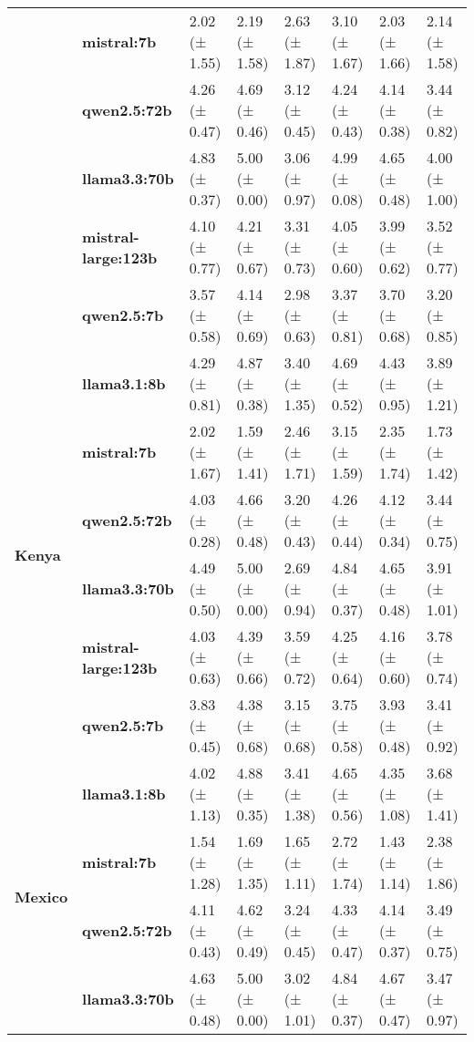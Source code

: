 \begin{tabular}{llllllll}
\textbf{} & \textbf{mistral:7b} & 2.02 (± 1.55) & 2.19 (± 1.58) & 2.63 (± 1.87) & 3.10 (± 1.67) & 2.03 (± 1.66) & 2.14 (± 1.58) \\
\textbf{} & \textbf{qwen2.5:72b} & 4.26 (± 0.47) & 4.69 (± 0.46) & 3.12 (± 0.45) & 4.24 (± 0.43) & 4.14 (± 0.38) & 3.44 (± 0.82) \\
\textbf{} & \textbf{llama3.3:70b} & 4.83 (± 0.37) & 5.00 (± 0.00) & 3.06 (± 0.97) & 4.99 (± 0.08) & 4.65 (± 0.48) & 4.00 (± 1.00) \\
\textbf{} & \textbf{mistral-large:123b} & 4.10 (± 0.77) & 4.21 (± 0.67) & 3.31 (± 0.73) & 4.05 (± 0.60) & 3.99 (± 0.62) & 3.52 (± 0.77) \\
\textbf{} & \textbf{qwen2.5:7b} & 3.57 (± 0.58) & 4.14 (± 0.69) & 2.98 (± 0.63) & 3.37 (± 0.81) & 3.70 (± 0.68) & 3.20 (± 0.85) \\
\cline{1-8}
\multirow[t]{6}{*}{\textbf{Kenya}} & \textbf{llama3.1:8b} & 4.29 (± 0.81) & 4.87 (± 0.38) & 3.40 (± 1.35) & 4.69 (± 0.52) & 4.43 (± 0.95) & 3.89 (± 1.21) \\
\textbf{} & \textbf{mistral:7b} & 2.02 (± 1.67) & 1.59 (± 1.41) & 2.46 (± 1.71) & 3.15 (± 1.59) & 2.35 (± 1.74) & 1.73 (± 1.42) \\
\textbf{} & \textbf{qwen2.5:72b} & 4.03 (± 0.28) & 4.66 (± 0.48) & 3.20 (± 0.43) & 4.26 (± 0.44) & 4.12 (± 0.34) & 3.44 (± 0.75) \\
\textbf{} & \textbf{llama3.3:70b} & 4.49 (± 0.50) & 5.00 (± 0.00) & 2.69 (± 0.94) & 4.84 (± 0.37) & 4.65 (± 0.48) & 3.91 (± 1.01) \\
\textbf{} & \textbf{mistral-large:123b} & 4.03 (± 0.63) & 4.39 (± 0.66) & 3.59 (± 0.72) & 4.25 (± 0.64) & 4.16 (± 0.60) & 3.78 (± 0.74) \\
\textbf{} & \textbf{qwen2.5:7b} & 3.83 (± 0.45) & 4.38 (± 0.68) & 3.15 (± 0.68) & 3.75 (± 0.58) & 3.93 (± 0.48) & 3.41 (± 0.92) \\
\cline{1-8}
\multirow[t]{6}{*}{\textbf{Mexico}} & \textbf{llama3.1:8b} & 4.02 (± 1.13) & 4.88 (± 0.35) & 3.41 (± 1.38) & 4.65 (± 0.56) & 4.35 (± 1.08) & 3.68 (± 1.41) \\
\textbf{} & \textbf{mistral:7b} & 1.54 (± 1.28) & 1.69 (± 1.35) & 1.65 (± 1.11) & 2.72 (± 1.74) & 1.43 (± 1.14) & 2.38 (± 1.86) \\
\textbf{} & \textbf{qwen2.5:72b} & 4.11 (± 0.43) & 4.62 (± 0.49) & 3.24 (± 0.45) & 4.33 (± 0.47) & 4.14 (± 0.37) & 3.49 (± 0.75) \\
\textbf{} & \textbf{llama3.3:70b} & 4.63 (± 0.48) & 5.00 (± 0.00) & 3.02 (± 1.01) & 4.84 (± 0.37) & 4.67 (± 0.47) & 3.47 (± 0.97) \\

\end{tabular}
